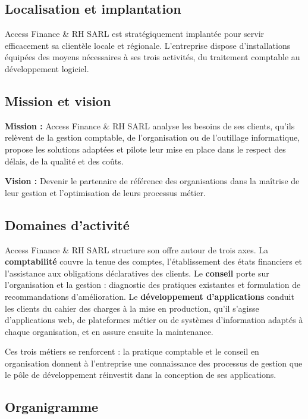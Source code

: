 \subsection{Localisation et implantation}

Access Finance \& RH SARL est stratégiquement implantée pour servir efficacement sa clientèle locale et régionale. L'entreprise dispose d'installations équipées des moyens nécessaires à ses trois activités, du traitement comptable au développement logiciel.

\subsection{Mission et vision}

\textbf{Mission :} Access Finance \& RH SARL analyse les besoins de ses clients, qu'ils relèvent de la gestion comptable, de l'organisation ou de l'outillage informatique, propose les solutions adaptées et pilote leur mise en place dans le respect des délais, de la qualité et des coûts.

\textbf{Vision :} Devenir le partenaire de référence des organisations dans la maîtrise de leur gestion et l'optimisation de leurs processus métier.

\subsection{Domaines d'activité}

Access Finance \& RH SARL structure son offre autour de trois axes. La \textbf{comptabilité} couvre la tenue des comptes, l'établissement des états financiers et l'assistance aux obligations déclaratives des clients. Le \textbf{conseil} porte sur l'organisation et la gestion : diagnostic des pratiques existantes et formulation de recommandations d'amélioration. Le \textbf{développement d'applications} conduit les clients du cahier des charges à la mise en production, qu'il s'agisse d'applications web, de plateformes métier ou de systèmes d'information adaptés à chaque organisation, et en assure ensuite la maintenance.

Ces trois métiers se renforcent : la pratique comptable et le conseil en organisation donnent à l'entreprise une connaissance des processus de gestion que le pôle de développement réinvestit dans la conception de ses applications.

\subsection{Organigramme}

